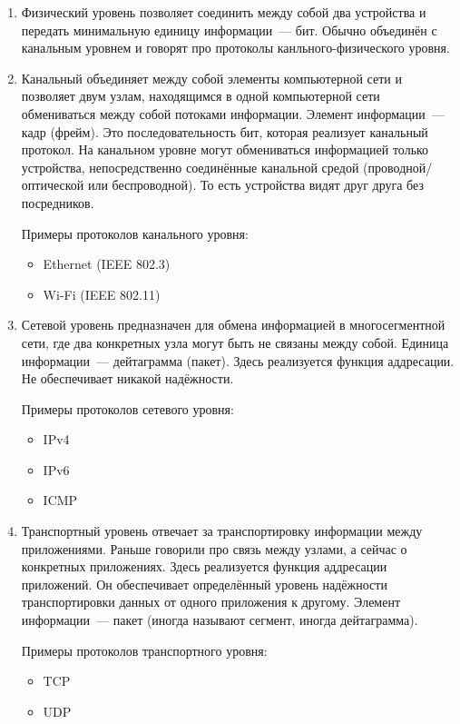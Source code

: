\begin{enumerate}

\item Физический уровень позволяет соединить между собой два устройства и передать минимальную единицу информации~--- бит. Обычно объединён с канальным уровнем и говорят про протоколы канльного-физического уровня.

\item Канальный объединяет между собой элементы компьютерной сети и позволяет двум узлам, находящимся в одной компьютерной сети обмениваться между собой потоками информации. Элемент информации~--- кадр (фрейм). Это последовательность бит, которая реализует канальный протокол. На канальном уровне могут обмениваться информацией только устройства, непосредственно соединённые канальной средой (проводной/оптической или беспроводной). То есть устройства видят друг друга без посредников. 

Примеры протоколов канального уровня: 
\begin{itemize}
    \item Ethernet (IEEE 802.3)
    \item Wi-Fi (IEEE 802.11)
\end{itemize}

\item Сетевой уровень предназначен для обмена информацией в многосегментной сети, где два конкретных узла могут быть не связаны между собой. Единица информации~--- дейтаграмма (пакет). Здесь реализуется функция аддресации. Не обеспечивает никакой надёжности.

Примеры протоколов сетевого уровня:
\begin{itemize}
    \item IPv4
    \item IPv6
    \item ICMP
\end{itemize}

\item Транспортный уровень отвечает за транспортировку информации между приложениями. Раньше говорили про связь между узлами, а сейчас о конкретных приложениях. Здесь реализуется функция аддресации приложений. Он обеспечивает определённый уровень надёжности транспортировки данных от одного приложения к другому. Элемент информации~--- пакет (иногда называют сегмент, иногда дейтаграмма).

Примеры протоколов транспортного уровня:
\begin{itemize}
    \item TCP
    \item UDP
\end{itemize}


\end{enumerate}
